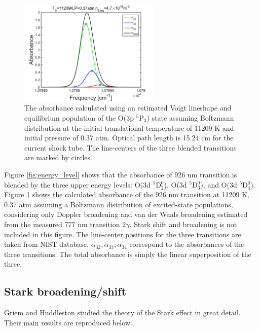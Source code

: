 \documentclass[12pt]{iopart}
\begin{document}
\begin{figure}[h]
  \centering
     \includegraphics[width=0.6\textwidth]{abs_sim.png}    \caption{\label{fig:lineshape_eq} The absorbance calculated using an estimated Voigt lineshape and equilibrium population of the O(3p $^5$P$_{3}$) state assuming Boltzmann distribution at the initial translational temperature of 11209 K and initial pressure of 0.37 atm. Optical path length is 15.24 cm for the current shock tube. The line-centers of the three blended transitions are marked by circles. }
\end{figure}
Figure \ref{fig:energy_level} shows that the absorbance of 926 nm transition is blended by the three upper energy levels: O(3d $^5$D$_{2}^0$), O(3d $^5$D$_{3}^0$), and O(3d $^5$D$_{4}^0$).  Figure \ref{fig:lineshape_eq} shows the calculated absorbance of the 926 nm transition at 11209 K, 0.37 atm assuming a Boltzmann distribution of excited-state populations, considering only Doppler broadening and van der Waals broadening estimated from the measured 777 nm transition $2\gamma$\cite{nations2015_new}. Stark shift and broadening is not included in this figure. The line-center positions for the three transitions are taken from NIST database. $\alpha_{32},\alpha_{33},\alpha_{34}$ correspond to the absorbances of the three transitions. The total absorbance is simply the linear superposition of the three.


\subsection{Stark broadening/shift}
Griem\cite{Griem1964} and Huddleston\cite{huddlestone_plasma_1965} studied the theory of the Stark effect in great detail. Their main results are reproduced below.
\end{document}
